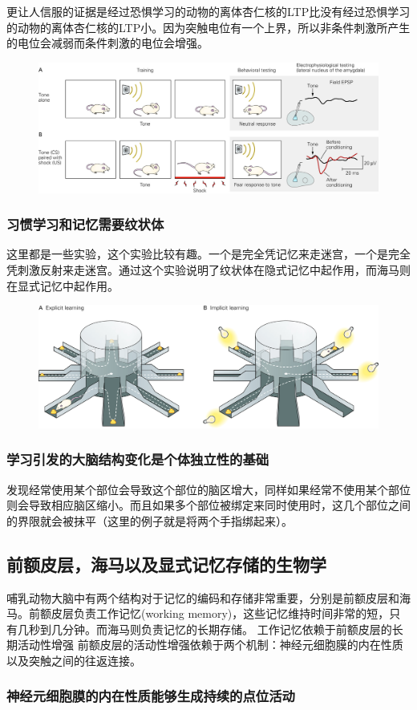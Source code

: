 \documentclass[UTF8,nofonts]{ctexart}
\begin{document}
\par
更让人信服的证据是经过恐惧学习的动物的离体杏仁核的LTP比没有经过恐惧学习的动物的离体杏仁核的LTP小。因为突触电位有一个上界，所以非条件刺激所产生的电位会减弱而条件刺激的电位会增强。
\begin{figure}[h]
	\centering
	\includegraphics[scale=0.9]{Pic/6613_PNS5.jpg}
\end{figure}
\subsubsection{习惯学习和记忆需要纹状体}
这里都是一些实验，这个实验比较有趣。一个是完全凭记忆来走迷宫，一个是完全凭刺激反射来走迷宫。通过这个实验说明了纹状体在隐式记忆中起作用，而海马则在显式记忆中起作用。
\newline
\begin{figure}[h]
	\centering
	\includegraphics[scale=0.9]{Pic/6615_PNS5.jpg}
\end{figure}

\subsubsection{学习引发的大脑结构变化是个体独立性的基础}
发现经常使用某个部位会导致这个部位的脑区增大，同样如果经常不使用某个部位则会导致相应脑区缩小。而且如果多个部位被绑定来同时使用时，这几个部位之间的界限就会被抹平（这里的例子就是将两个手指绑起来）。
\subsection{前额皮层，海马以及显式记忆存储的生物学}
哺乳动物大脑中有两个结构对于记忆的编码和存储非常重要，分别是前额皮层和海马。前额皮层负责工作记忆(working memory)，这些记忆维持时间非常的短，只有几秒到几分钟。而海马则负责记忆的长期存储。
工作记忆依赖于前额皮层的长期活动性增强
前额皮层的活动性增强依赖于两个机制：神经元细胞膜的内在性质以及突触之间的往返连接。
\subsubsection{神经元细胞膜的内在性质能够生成持续的点位活动}
\end{document}
